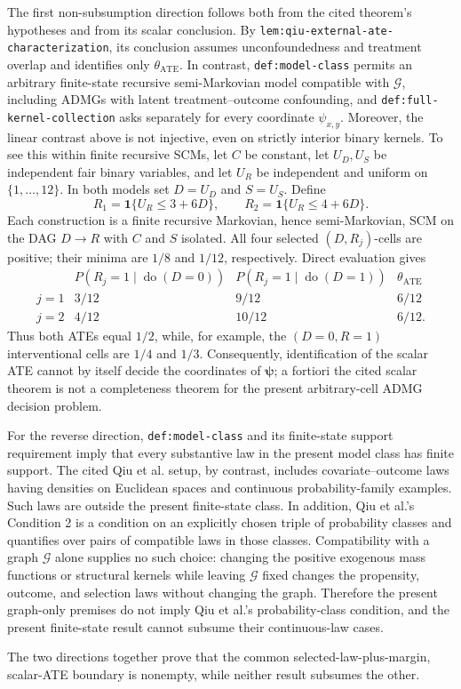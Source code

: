 The first non-subsumption direction follows both from the cited theorem's hypotheses and from its scalar conclusion. By \texttt{lem:qiu-external-ate-characterization}, its conclusion assumes unconfoundedness and treatment overlap and identifies only \(\theta_{\mathrm{ATE}}\). In contrast, \texttt{def:model-class} permits an arbitrary finite-state recursive semi-Markovian model compatible with \(\mathcal G\), including ADMGs with latent treatment--outcome confounding, and \texttt{def:full-kernel-collection} asks separately for every coordinate \(\psi_{x,y}\). Moreover, the linear contrast above is not injective, even on strictly interior binary kernels. To see this within finite recursive SCMs, let \(C\) be constant, let \(U_D,U_S\) be independent fair binary variables, and let \(U_R\) be independent and uniform on \(\{1,\ldots,12\}\). In both models set \(D=U_D\) and \(S=U_S\). Define
\[
R_1=\mathbf 1\{U_R\le 3+6D\},
\qquad
R_2=\mathbf 1\{U_R\le 4+6D\}.
\]
Each construction is a finite recursive Markovian, hence semi-Markovian, SCM on the DAG \(D\to R\) with \(C\) and \(S\) isolated. All four selected \((D,R_j)\)-cells are positive; their minima are \(1/8\) and \(1/12\), respectively. Direct evaluation gives
\[
\begin{array}{c|cc|c}
 & P(R_j=1\mid\operatorname{do}(D=0))
 & P(R_j=1\mid\operatorname{do}(D=1))
 & \theta_{\mathrm{ATE}}\\ \hline
j=1 & 3/12 & 9/12 & 6/12\\
j=2 & 4/12 & 10/12 & 6/12.
\end{array}
\]
Thus both ATEs equal \(1/2\), while, for example, the \((D=0,R=1)\) interventional cells are \(1/4\) and \(1/3\). Consequently, identification of the scalar ATE cannot by itself decide the coordinates of \(\boldsymbol\psi\); a fortiori the cited scalar theorem is not a completeness theorem for the present arbitrary-cell ADMG decision problem.

For the reverse direction, \texttt{def:model-class} and its finite-state support requirement imply that every substantive law in the present model class has finite support. The cited Qiu et al. setup, by contrast, includes covariate--outcome laws having densities on Euclidean spaces and continuous probability-family examples. Such laws are outside the present finite-state class. In addition, Qiu et al.'s Condition 2 is a condition on an explicitly chosen triple of probability classes and quantifies over pairs of compatible laws in those classes. Compatibility with a graph \(\mathcal G\) alone supplies no such choice: changing the positive exogenous mass functions or structural kernels while leaving \(\mathcal G\) fixed changes the propensity, outcome, and selection laws without changing the graph. Therefore the present graph-only premises do not imply Qiu et al.'s probability-class condition, and the present finite-state result cannot subsume their continuous-law cases.

The two directions together prove that the common selected-law-plus-margin, scalar-ATE boundary is nonempty, while neither result subsumes the other.